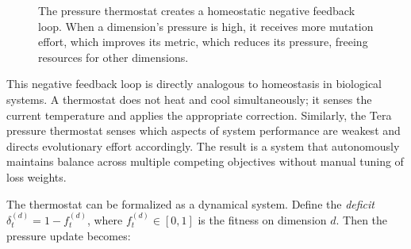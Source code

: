 \begin{figure}[t]
\centering
{}
\caption{The pressure thermostat creates a homeostatic negative feedback loop. When a dimension's pressure is high, it receives more mutation effort, which improves its metric, which reduces its pressure, freeing resources for other dimensions.}
\label{fig:thermostat-loop}
\end{figure}

\begin{bioinsight}
This negative feedback loop is directly analogous to homeostasis in biological systems. A thermostat does not heat and cool simultaneously; it senses the current temperature and applies the appropriate correction. Similarly, the Tera pressure thermostat senses which aspects of system performance are weakest and directs evolutionary effort accordingly. The result is a system that autonomously maintains balance across multiple competing objectives without manual tuning of loss weights.
\end{bioinsight}

The thermostat can be formalized as a dynamical system. Define the \emph{deficit} $\delta_t^{(d)} = 1 - f_t^{(d)}$, where $f_t^{(d)} \in [0,1]$ is the fitness on dimension $d$. Then the pressure update becomes:

